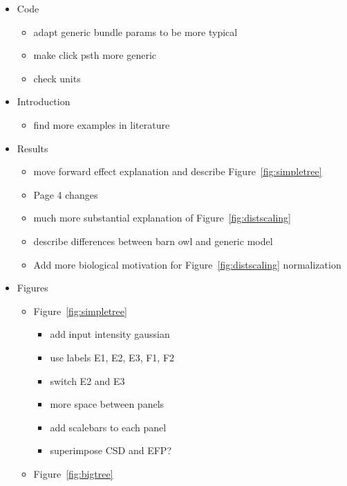 \documentclass[]{article}
\providecommand{\tightlist}{%
  \setlength{\itemsep}{0pt}\setlength{\parskip}{0pt}}
\begin{document}
\begin{itemize}
\tightlist
\item
  Code

  \begin{itemize}
  \tightlist
  \item
    adapt generic bundle params to be more typical
  \item
    make click psth more generic
  \item
    check units
  \end{itemize}
\item
  Introduction

  \begin{itemize}
  \tightlist
  \item
    find more examples in literature
  \end{itemize}
\item
  Results

  \begin{itemize}
  \tightlist
  \item
    move forward effect explanation and describe
    Figure~\ref{fig:simpletree}
  \item
    Page 4 changes
  \item
    much more substantial explanation of Figure~\ref{fig:distscaling}
  \item
    describe differences between barn owl and generic model
  \item
    Add more biological motivation for Figure~\ref{fig:distscaling}
    normalization
  \end{itemize}
\item
  Figures

  \begin{itemize}
  \tightlist
  \item
    Figure~\ref{fig:simpletree}

    \begin{itemize}
    \tightlist
    \item
      add input intensity gaussian
    \item
      use labels E1, E2, E3, F1, F2
    \item
      switch E2 and E3
    \item
      more space between panels
    \item
      add scalebars to each panel
    \item
      superimpose CSD and EFP?
    \end{itemize}
  \item
    Figure~\ref{fig:bigtree}


\end{itemize}
\end{itemize}
\end{document}
